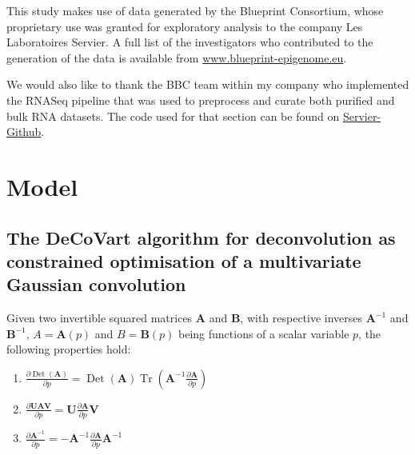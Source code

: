 \documentclass[long, final]{jobim}
\DeclareMathOperator*{\Tr}{Tr}
\DeclareMathOperator*{\DET}{Det}
\begin{document}
\begin{acknowledgements}
  \label{sec:acknowledgements}
This study makes use of data generated by the Blueprint Consortium, whose proprietary use was granted for exploratory analysis to the company Les Laboratoires Servier. A full list of the investigators who contributed to the generation of the data is available from \url{www.blueprint-epigenome.eu}.

We would also like to thank the BBC team within my company who implemented the RNASeq pipeline that was used to preprocess and curate both purified and bulk RNA datasets. The code used for that section can be found on \href{https://github.com/orgs/servier-github/repositories}{Servier-Github}.

\end{acknowledgements}


 

 \appendix

\section{Model}
\subsection{The DeCoVart algorithm for deconvolution as constrained optimisation of a multivariate Gaussian convolution}
\label{subsubsec:contrained-optimisation}



\begin{property}
\label{pr:matrix-calculus-part-1}
Given two invertible squared matrices $\boldsymbol{A}$ and $\boldsymbol{B}$, with respective inverses $\boldsymbol{A}^{-1}$ and $\boldsymbol{B}^{-1}$, $A=\boldsymbol{A}(p)$ and $B=\boldsymbol{B}(p)$ being functions of a scalar variable $p$, the following properties hold:
\begin{multicols}{3}
\begin{enumerate}[label=(\alph*)]
\item $\frac{\partial \DET(\boldsymbol{A})}{\partial p}=\DET(\boldsymbol{A}) \Tr \left(\boldsymbol{A}^{-1} \frac{\partial \boldsymbol{A}}{\partial p} \right)$
\item $\frac{\partial \boldsymbol{U}\boldsymbol{A}\boldsymbol{V}}{\partial p} = \boldsymbol{U} \frac{\partial\boldsymbol{A}}{\partial p} \boldsymbol{V}$
\item $\frac{\partial \boldsymbol{A}^{-1}}{\partial p} = -\boldsymbol{A}^{-1} \frac{\partial\boldsymbol{A}}{\partial p} \boldsymbol{A}^{-1}$
\end{enumerate}
\end{multicols}
\end{property}
\end{document}
